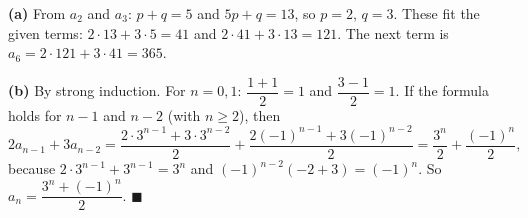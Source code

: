 \textbf{(a)} From $a_2$ and $a_3$: $p+q=5$ and $5p+q=13$, so $p=2$, $q=3$. These fit the given terms: $2\cdot13+3\cdot5=41$ and $2\cdot41+3\cdot13=121$. The next term is $a_6=2\cdot121+3\cdot41=\boxed{365}$.

\textbf{(b)} By strong induction. For $n=0,1$: $\dfrac{1+1}{2}=1$ and $\dfrac{3-1}{2}=1$. If the formula holds for $n-1$ and $n-2$ (with $n\ge2$), then
\[2a_{n-1}+3a_{n-2}=\dfrac{2\cdot3^{n-1}+3\cdot3^{n-2}}{2}+\dfrac{2(-1)^{n-1}+3(-1)^{n-2}}{2}=\dfrac{3^n}{2}+\dfrac{(-1)^{n}}{2},\]
because $2\cdot3^{n-1}+3^{n-1}=3^n$ and $(-1)^{n-2}\left(-2+3\right)=(-1)^n$. So $a_n=\dfrac{3^n+(-1)^n}{2}$. $\blacksquare$
